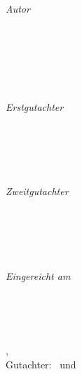 \begin{titlepage}
	\vfill
	\begin{minipage}[t]{.27\textwidth}
		\raggedleft
		\textit{Autor}
	\end{minipage}
	\hspace*{15pt}
	\begin{minipage}[t]{.65\textwidth}
		{\Large \thesisAuthor} \\
	  	{\thesisAuthorStudentNumber} \\
	  	{\thesisAuthorEmail} \\
    \end{minipage} \\[5mm]
    \begin{minipage}[t]{.27\textwidth}
		\raggedleft
		\textit{Erstgutachter}
	\end{minipage}
	\hspace*{15pt}
	\begin{minipage}[t]{.65\textwidth}
		{\Large \thesisFirstReviewer} \\
	  	{\thesisFirstReviewerEmail} \\
	\end{minipage} \\[5mm]
	\begin{minipage}[t]{.27\textwidth}
		\raggedleft
		\textit{Zweitgutachter}
	\end{minipage}
	\hspace*{15pt}
	\begin{minipage}[t]{.65\textwidth}
		{\Large \thesisSecondReviewer} \\
	  	{\thesisSecondReviewerEmail} \\
	\end{minipage} \\[10mm]
	\begin{minipage}[t]{.27\textwidth}
		\raggedleft
		\textit{Eingereicht am}
	\end{minipage}
	\hspace*{15pt}
	\begin{minipage}[t]{.65\textwidth}
		\thesisDate
	\end{minipage} \\

\end{titlepage}


\hfill
\vfill
{
	\small
	\textbf{\thesisAuthor} \\
	\textit{\thesisTitle} \\
	\thesisSubtitle, \thesisDate \\
    Gutachter: \thesisFirstReviewer\ und \thesisSecondReviewer

	\textbf{\thesisUniversity} \\
	\thesisUniversityStreetAddress \\
	\thesisUniversityPostalCode\ \thesisUniversityCity
}
